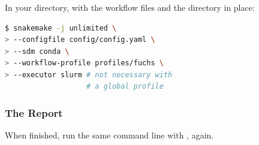 \begin{frame}[fragile]
    \frametitle{}
    In your  directory, with the workflow files and the  directory in place:
    \begin{lstlisting}[language=Bash, style=Shell]
$ snakemake -j unlimited \
> --configfile config/config.yaml \
> --sdm conda \
> --workflow-profile profiles/fuchs \
> --executor slurm # not necessary with
                   # a global profile
    \end{lstlisting}
\end{frame}

\begin{frame}[fragile]
  \frametitle{The Report}
  When finished, run the same command line with , again.
\end{frame}
